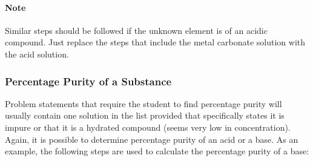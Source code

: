 \paragraph{Note} Similar steps should be followed if the unknown element is of an acidic compound. Just replace the steps that include the metal carbonate solution with the acid solution.

\subsubsection{Percentage Purity of a Substance}

Problem statements that require the student to find percentage purity will usually contain one solution in the list provided that specifically states it is impure or that it is a hydrated compound (seems very low in concentration). Again, it is possible to determine percentage purity of an acid or a base. As an example, the following steps are used to calculate the percentage purity of a base:

